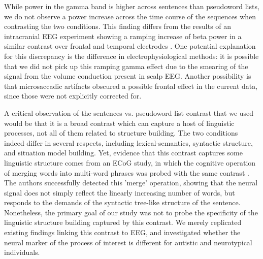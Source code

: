 While power in the gamma band is higher across sentences than pseudoword lists, we do not observe a power increase across the time course of the sequences when contrasting the two conditions. This finding differs from the results of an intracranial EEG experiment showing a ramping increase of beta power in a similar contrast over frontal and temporal electrodes \citep{fedorenko2016}. One potential explanation for this discrepancy is the difference in electrophysiological methods: it is possible that we did not pick up this ramping gamma effect due to the smearing of the signal from the volume conduction present in scalp EEG. Another possibility is that microsaccadic artifacts obscured a possible frontal effect in the current data, since those were not explicitly corrected for.   

A critical observation of the sentences vs. pseudoword list contrast that we used would be that it is a broad contrast which can capture a host of linguistic processes, not all of them related to structure building. The two conditions indeed differ in several respects, including lexical-semantics, syntactic structure, and situation model building. Yet, evidence that this contrast captures some linguistic structure comes from an ECoG study, in which the cognitive operation of merging words into multi-word phrases was probed with the same contrast \citep{nelson2017}. The authors successfully detected this 'merge' operation, showing that the neural signal does not simply reflect the linearly increasing number of words, but responds to the demands of the syntactic tree-like structure of the sentence. Nonetheless, the primary goal of our study was not to probe the specificity of  the linguistic structure building captured by this contrast. We merely replicated existing findings linking this contrast to EEG, and investigated whether the neural marker of the process of interest is different for autistic and neurotypical individuals. 

